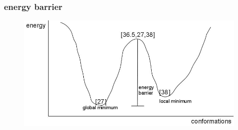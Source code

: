 \documentclass[ignorenonframetext,10pt]{beamer}
\begin{document}
\normalsize
\begin{frame}
\frametitle{energy barrier}  
\begin{figure}
  \includegraphics[scale=0.4]{images/energy_barrier.jpg} 
\end{figure}
\end{frame}
\end{document}
